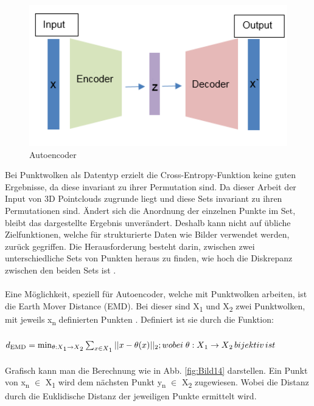 \documentclass{llncs}
\begin{document}
\begin{figure}[htbp] 
	\centering
	\includegraphics[width=1.0\textwidth]{autoencoder2.png}
	\caption{Autoencoder}
	\label{fig:Bild13}
\end{figure}
Bei Punktwolken als Datentyp erzielt die Cross-Entropy-Funktion keine guten Ergebnisse, da diese invariant zu ihrer Permutation sind. Da dieser Arbeit der Input von 3D Pointclouds zugrunde liegt und diese Sets  invariant zu ihren Permutationen sind. Ändert sich die Anordnung der einzelnen Punkte im Set, bleibt das dargestellte Ergebnis unverändert.  Deshalb kann nicht auf übliche Zielfunktionen, welche für strukturierte Daten wie Bilder verwendet werden, zurück gegriffen. Die Herausforderung besteht darin, zwischen zwei unterschiedliche Sets von Punkten heraus zu finden, wie hoch die Diskrepanz zwischen den beiden Sets ist \cite{invariant}. 
\\\\
Eine Möglichkeit, speziell für Autoencoder, welche mit Punktwolken arbeiten, ist die Earth Mover Distance (EMD). Bei dieser sind X\textsubscript{1} und X\textsubscript{2} zwei Punktwolken, mit jeweils x\textsubscript{n} definierten Punkten \cite{autoencoderloss}. Definiert ist sie durch die Funktion:
\\\\
\begin{math}
d\textsubscript{EMD}=\min_{\theta : X\textsubscript{1}\rightarrow X\textsubscript{2}}  \sum_{x\in X\textsubscript{1}}|| x - \theta(x)||\textsubscript{2};wobei\;\theta: X\textsubscript{1} \rightarrow X\textsubscript{2}\, bijektiv\, ist 
\end{math}
\\\\
Grafisch kann man die Berechnung wie in Abb. \ref{fig:Bild14} darstellen. Ein Punkt von x\textsubscript{n} $\in$ X\textsubscript{1} wird dem nächsten Punkt y\textsubscript{n} $\in$  X\textsubscript{2} zugewiesen. Wobei die Distanz durch die Euklidische Distanz der jeweiligen Punkte ermittelt wird. 
\end{document}
